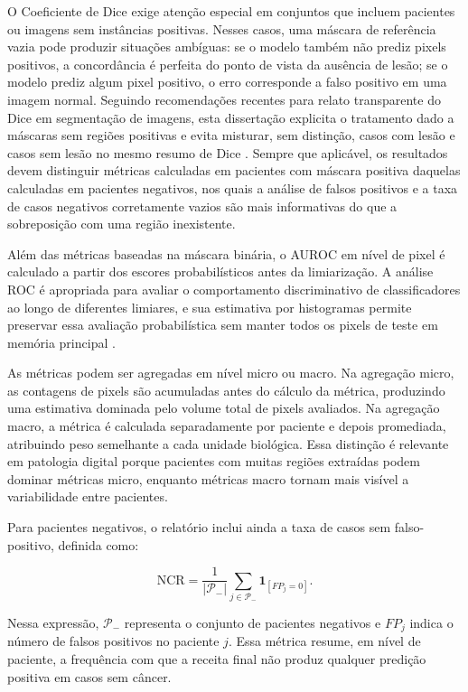O Coeficiente de Dice exige atenção especial em conjuntos que incluem pacientes
ou imagens sem instâncias positivas. Nesses casos, uma máscara de referência
vazia pode produzir situações ambíguas: se o modelo também não prediz pixels
positivos, a concordância é perfeita do ponto de vista da ausência de lesão; se
o modelo prediz algum pixel positivo, o erro corresponde a falso positivo em uma
imagem normal. Seguindo recomendações recentes para relato transparente do Dice
em segmentação de imagens, esta dissertação explicita o tratamento dado a
máscaras sem regiões positivas e evita misturar, sem distinção, casos com lesão e
casos sem lesão no mesmo resumo de Dice \cite{seghier2024dice}. Sempre que
aplicável, os resultados devem distinguir métricas calculadas em pacientes com
máscara positiva daquelas calculadas em pacientes negativos, nos quais a análise
de falsos positivos e a taxa de casos negativos corretamente vazios são mais
informativas do que a sobreposição com uma região inexistente.

Além
das métricas baseadas na máscara binária, o AUROC em nível de pixel é calculado
a partir dos escores probabilísticos antes da limiarização. A análise ROC é
apropriada para avaliar o comportamento discriminativo de classificadores ao
longo de diferentes limiares, e sua estimativa por histogramas permite preservar
essa avaliação probabilística sem manter todos os pixels de teste em memória
principal \cite{fawcett2006roc}.

As métricas podem ser agregadas em nível micro ou macro. Na agregação micro, as
contagens de pixels são acumuladas antes do cálculo da métrica, produzindo uma
estimativa dominada pelo volume total de pixels avaliados. Na agregação macro, a
métrica é calculada separadamente por paciente e depois promediada, atribuindo
peso semelhante a cada unidade biológica. Essa distinção é relevante em
patologia digital porque pacientes com muitas regiões extraídas podem dominar
métricas micro, enquanto métricas macro tornam mais visível a variabilidade
entre pacientes.

Para pacientes negativos, o relatório inclui ainda a taxa de casos sem
falso-positivo, definida como:

\begin{equation}
    \mathrm{NCR} =
    \frac{1}{|\mathcal{P}_-|}
    \sum_{j\in\mathcal{P}_-}
    \mathbf{1}_{[FP_j=0]} .
    \label{eq:ncr}
\end{equation}

Nessa expressão, $\mathcal{P}_-$ representa o conjunto de pacientes negativos e
$FP_j$ indica o número de falsos positivos no paciente $j$. Essa métrica resume,
em nível de paciente, a frequência com que a receita final não produz qualquer
predição positiva em casos sem câncer.

